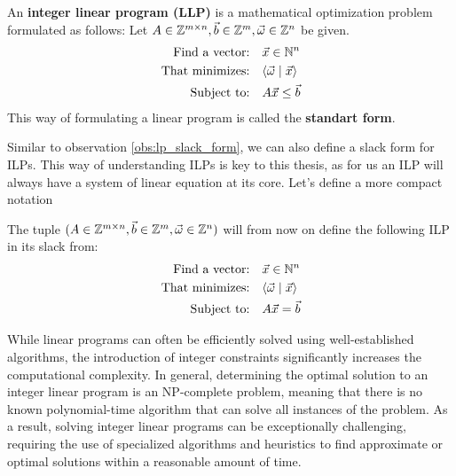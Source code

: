 \begin{definition}
    An \textbf{integer linear program (LLP)} is a mathematical optimization problem formulated as follows: Let $A\in\mathbb{Z}^{m\times n}, \vec b \in \mathbb{Z}^m, \vec\omega \in \mathbb{Z}^n$ be given.
    \begin{align*}
        \text{Find a vector:} & \quad \vec x \in \mathbb{N}^n \\
        \text{That minimizes:} & \quad \langle \vec \omega \mid \vec x \rangle\\
        \text{Subject to:} & \quad A\vec x \leq \vec b \\
    \end{align*}
    This way of formulating a linear program is called the \textbf{standart form}.
\end{definition}
\begin{observation}
    Similar to observation \ref{obs:lp_slack_form}, we can also define a slack form for ILPs. This way of understanding ILPs is key to this thesis, as for us an ILP will always have a system of linear equation at its core. Let's define a more compact notation
\end{observation}

\begin{definition}
    The tuple $(A\in\mathbb{Z}^{m\times n}, \vec b \in \mathbb{Z}^m, \vec\omega \in \mathbb{Z}^n)$ will from now on define the following ILP in its slack from:
    \begin{align*}
        \text{Find a vector:} & \quad \vec x \in \mathbb{N}^n \\
        \text{That minimizes:} & \quad \langle \vec \omega \mid \vec x \rangle\\
        \text{Subject to:} & \quad A\vec x = \vec b \\
    \end{align*}
\end{definition}

While linear programs can often be efficiently solved using well-established algorithms, the introduction of integer constraints significantly increases the computational complexity. In general, determining the optimal solution to an integer linear program is an NP-complete problem, meaning that there is no known polynomial-time algorithm that can solve all instances of the problem. As a result, solving integer linear programs can be exceptionally challenging, requiring the use of specialized algorithms and heuristics to find approximate or optimal solutions within a reasonable amount of time. 
